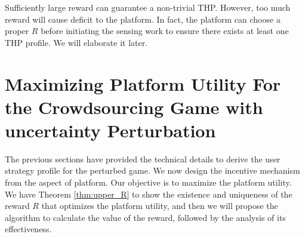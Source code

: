 \documentclass{IEEEtran}
\begin{document}
Sufficiently large reward can guarantee a non-trivial THP. However, too much reward will cause deficit to the platform. In fact, the platform can choose a proper $R$ before initiating the sensing work to ensure there exists at least one THP profile. We will elaborate it later.

\section{Maximizing Platform Utility For the Crowdsourcing Game with uncertainty Perturbation}
\label{sec:platform_reward}
{\color{black}The previous sections have provided the technical details to derive the user strategy profile for the perturbed game. We now design the incentive mechanism from the aspect of platform. Our objective is to maximize the platform utility. We have Theorem \ref{thm:upper_R} to show the existence and uniqueness of the reward $R$ that optimizes the platform utility, and then we will propose the algorithm to calculate the value of the reward, followed by the analysis of its effectiveness.} %
\end{document}
